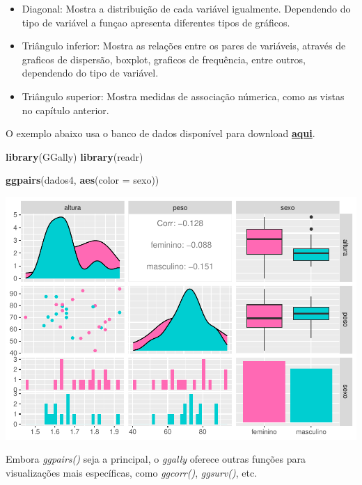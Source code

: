 \documentclass[
]{book}
\newenvironment{Shaded}{\begin{snugshade}}{\end{snugshade}}
\newcommand{\AttributeTok}[1]{\textcolor[rgb]{0.13,0.29,0.53}{#1}}
\newcommand{\FunctionTok}[1]{\textcolor[rgb]{0.13,0.29,0.53}{\textbf{#1}}}
\newcommand{\NormalTok}[1]{#1}
\providecommand{\tightlist}{%
  \setlength{\itemsep}{0pt}\setlength{\parskip}{0pt}}
\begin{document}
\begin{itemize}
\tightlist
\item
  Diagonal: Mostra a distribuição de cada variável igualmente. Dependendo do tipo de variável a funçao apresenta diferentes tipos de gráficos.
\item
  Triângulo inferior: Mostra as relações entre os pares de variáveis, através de graficos de dispersão, boxplot, graficos de frequência, entre outros, dependendo do tipo de variável.
\item
  Triângulo superior: Mostra medidas de associação númerica, como as vistas no capítulo anterior.
\end{itemize}

O exemplo abaixo usa o banco de dados disponível para download \textbf{\href{./arquivos/dados_cap8.csv}{aqui}}.

\begin{Shaded}
\begin{Highlighting}[]
\FunctionTok{library}\NormalTok{(GGally)}
\FunctionTok{library}\NormalTok{(readr)}

\FunctionTok{ggpairs}\NormalTok{(dados4, }\FunctionTok{aes}\NormalTok{(}\AttributeTok{color =}\NormalTok{ sexo))}
\end{Highlighting}
\end{Shaded}

\begin{center}\includegraphics{AED_files/figure-latex/matriz_graficos-1} \end{center}

Embora \emph{ggpairs()} seja a principal, o \emph{ggally} oferece outras funções para visualizações mais específicas, como \emph{ggcorr()}, \emph{ggsurv()}, etc.
\end{document}
